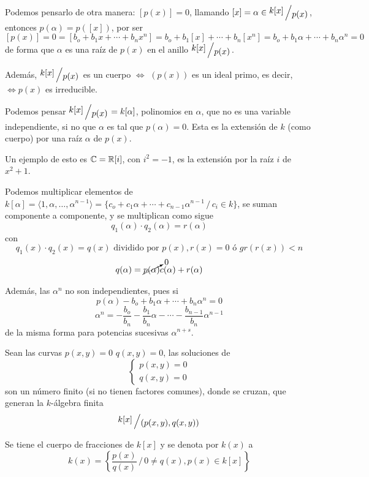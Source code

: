     \begin{obs}     
        Podemos pensarlo de otra manera: $[p(x)] = 0$, llamando $[x]=\alpha \in \modulo{k[x]}{p(x)}$, entonces $p(\alpha) = p([x])$, por ser 
        $$[p(x)]=0 = [b_o + b_1x + \cdots + b_n x^n] = b_o + b_1 [x] + \cdots +b_n [x^n] = b_o + b_1 \alpha + \cdots + b_n \alpha ^n = 0$$
        de forma que $\alpha$ es una ra\'iz de $p(x)$ en el anillo $\modulo{k[x]}{p(x)}$. 

        Adem\'as, $\modulo{k[x]}{p(x)}$ es un cuerpo $\iff$ $(p(x))$ es un ideal primo, es decir, $\iff p(x)$ es irreducible. 

        Podemos pensar $\modulo{k[x]}{p(x)} = k[\alpha]$, polinomios en $\alpha$, que no es una variable independiente, si no que $\alpha$ es tal que $p(\alpha)=0$. Esta es la extensi\'on de $k$ (como cuerpo) por una ra\'iz $\alpha$ de $p(x)$. 

        Un ejemplo de esto es $\mathbb{C} = \mathbb{R}[i]$, con $i^2=-1$, es la extensi\'on por la ra\'iz $i$ de $x^2+1$.  

        Podemos multiplicar elementos de $k[\alpha] = \langle 1, \alpha, \ldots, \alpha^{n-1} \rangle = \{ c_o + c_1 \alpha + \cdots +  c_{n-1} \alpha^{n-1} \, / \, c_i  \in k\}$, se suman componente a componente, y se multiplican como sigue
        $$q_1(\alpha) \cdot q_2(\alpha) = r(\alpha)$$
        con
        $$q_1(x) \cdot q_2(x) = q(x) \text{ dividido por } p(x), r(x) = 0 \text{ \'o } gr(r(x)) < n$$
        $$q(\alpha) = \cancelto{0}{p(\alpha)} c(\alpha) + r(\alpha)$$

        Adem\'as, las $\alpha^n$ no son independientes, pues si 
        $$p(\alpha) - b_o + b_1 \alpha + \cdots + b_n \alpha^n=0$$
        $$\alpha^n = - \frac{b_o}{b_n} - \frac{b_1}{b_n} \alpha - \cdots - \frac{b_{n-1}}{b_n} \alpha^{n-1}$$
        de la misma forma para potencias sucesivas $\alpha^{n+s}$.  
    \end{obs}
    \begin{ejem}
        Sean las curvas $p(x,y)=0$ $q(x,y)=0$, las soluciones de 
        $$\begin{cases}
            p(x,y) =0 \\ q(x,y)=0
        \end{cases}$$
        son un n\'umero finito (si no tienen factores comunes), donde se cruzan, que generan la $k$-\'algebra finita
        $$\modulo{k[x]}{(p(x,y), q(x,y))}$$
    \end{ejem}
    \begin{defi}
        Se tiene el cuerpo de fracciones de $k[x]$ y se denota por $k(x)$ a 
        $$k(x) = \left\{ \frac{p(x)}{q(x)} \, / \, 0\neq q(x), p(x) \in k[x] \right\}$$
    \end{defi}
